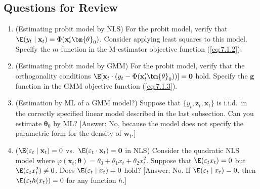 \subsection*{Questions for Review}

\begin{enumerate}
\item (Estimating probit model by NLS) \enspace For the probit model, verify that $\E(y_t \mid \mathbf{x}_t) = \Phi(\mathbf{x}_t' \bm{\theta}_0)$. Consider applying least squares to this model. Specify the $m$ function in the M-estimator objective function (\ref{eq:7.1.2}).

\item (Estimating probit model by GMM) \enspace For the probit model, verify that the orthogonality conditions $\E[\mathbf{x}_t \cdot (y_t - \Phi(\mathbf{x}_t' \bm{\theta}_0))] = \mathbf{0}$ hold. Specify the $\mathbf{g}$ function in the GMM objective function (\ref{eq:7.1.3}).

\item (Estimation by ML of a GMM model?) \enspace Suppose that $\{y_t, \mathbf{z}_t, \mathbf{x}_t\}$ is i.i.d.\ in the correctly specified linear model described in the last subsection. Can you estimate $\bm{\theta}_0$ by ML? [Answer: No, because the model does not specify the parametric form for the density of $\mathbf{w}_t$.]

\item ($\E(\varepsilon_t \mid \mathbf{x}_t) = 0$ vs.\ $\E(\varepsilon_t \cdot \mathbf{x}_t) = \mathbf{0}$ in NLS) \enspace Consider the quadratic NLS model where $\varphi(\mathbf{x}_t; \bm{\theta}) = \theta_0 + \theta_1 x_t + \theta_2 x_t^2$. Suppose that $\E(\varepsilon_t x_t) = 0$ but $\E(\varepsilon_t x_t^2) \neq 0$. Does $\E(\varepsilon_t \mid x_t) = 0$ hold? [Answer: No. If $\E(\varepsilon_t \mid x_t) = 0$, then $\E(\varepsilon_t h(x_t)) = 0$ for any function $h$.]
\end{enumerate}

